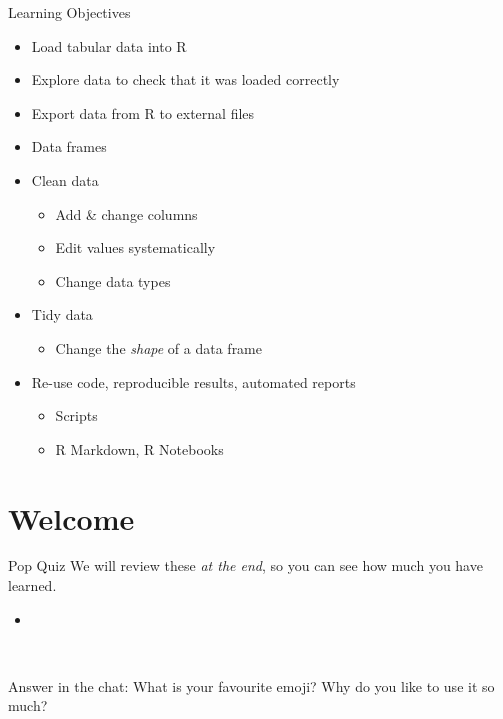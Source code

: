 \documentclass[
  11pt,
  ignorenonframetext,
]{beamer}
\providecommand{\tightlist}{%
  \setlength{\itemsep}{0pt}\setlength{\parskip}{0pt}}
\newcommand{\fade}[1]{\textcolor[rgb]{0.66,0.66,0.66}{#1}}
\newcommand{\annote}[1]{{\footnotesize #1}}
\begin{document}
\begin{frame}{Learning Objectives}
\protect\hypertarget{learning-objectives}{}
\begin{itemize}
\tightlist
\item
  Load tabular data into R
\item
  Explore data to check that it was loaded correctly
\item
  Export data from R to external files
\item
  Data frames
\item
  Clean data

  \begin{itemize}
  \tightlist
  \item
    Add \& change columns
  \item
    Edit values systematically
  \item
    Change data types
  \end{itemize}
\item
  Tidy data

  \begin{itemize}
  \tightlist
  \item
    Change the \emph{shape} of a data frame
  \end{itemize}
\item
  Re-use code, reproducible results, automated reports

  \begin{itemize}
  \tightlist
  \item
    Scripts
  \item
    R Markdown, R Notebooks
  \end{itemize}
\end{itemize}
\end{frame}

\hypertarget{welcome}{%
\section{Welcome}\label{welcome}}

\begin{frame}{Pop Quiz}
\protect\hypertarget{pop-quiz}{}
\annote{\fade{We will review these \textit{at the end}, so you can see how much you have learned.}}

\begin{itemize}
\tightlist
\item
\end{itemize}

~

\begin{block}{Answer in the chat:}
\protect\hypertarget{answer-in-the-chat}{}
What is your favourite emoji? Why do you like to use it so much?
\end{block}
\end{frame}
\end{document}
